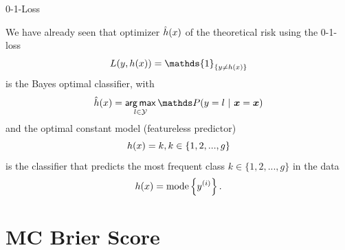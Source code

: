 \begin{vbframe}{0-1-Loss}

We have already seen that optimizer $\hat{h}(x)$ of the theoretical risk using the 0-1-loss 
$$ 
L(y, \hx) = \mathds{1}_{\{y \neq \hx\}} 
$$
is the Bayes optimal classifier, with
$$ 
\hxh = \argmax_{l \in \Yspace} \P(y = l~|~ \xv = \xv)
$$
and the optimal constant model (featureless predictor) 
$$
h(x) = k, k \in \{1, 2, ..., g\} 
$$
is the classifier that predicts the most frequent class $k \in \{1, 2, ..., g\}$ in the data
$$
h(x) = \text{mode} \left\{y^{(i)}\right\}.
$$
\framebreak



\end{vbframe}



\section{MC Brier Score}


